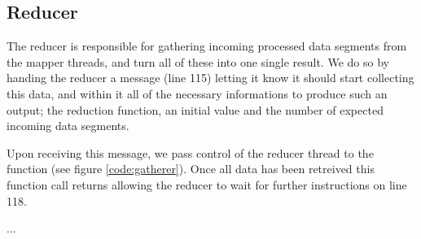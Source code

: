 \subsection{Reducer}
The reducer is responsible for gathering incoming processed data segments from
the mapper threads, and turn all of these into one single result. We do so by
handing the reducer a message (line 115) letting it know it should start
collecting this data, and within it all of the necessary informations to
produce such an output; the reduction function, an initial value and the
number of expected incoming data segments.

Upon receiving this message, we pass control of the reducer thread to the
 function (see figure \ref{code:gatherer}).
Once all data has been retreived this function call returns allowing the
reducer to wait for further instructions on line 118.


...

